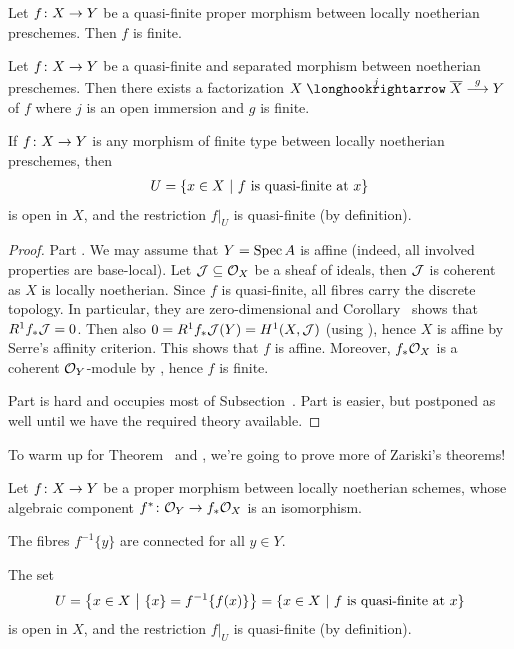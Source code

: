 \documentclass[a4paper,parskip=half,numbers=enddot, DIV=12]{scrreprt}
\begin{document}
\begin{thm}
	\begin{alphanumerate}
		\item {}Let $f\colon X\morphism Y$ be a quasi-finite proper morphism between locally noetherian preschemes. Then $f$ is finite.
		\item Let $f\colon X\morphism Y$ be a quasi-finite and separated morphism between noetherian preschemes. Then there exists a factorization $X\monomorphism[j]\ov{X}\morphism[g]Y$ of $f$ where $j$ is an open immersion and $g$ is finite.
		\item If $f\colon X\morphism Y$ is any morphism of finite type between locally noetherian preschemes, then 
		\begin{align*}
			U=\left\{x\in X\ \middle|\  f\text{ is quasi-finite at }x\right\}
		\end{align*}
		is open in $X$, and the restriction $f|_U$ is quasi-finite (by definition).
	\end{alphanumerate}
\end{thm}
\begin{proof}
	Part . We may assume that $Y=\operatorname{Spec} A$ is affine (indeed, all involved properties are base-local). Let $\mathcal{J}\subseteq \mathcal{O}_X$ be a sheaf of ideals, then $\mathcal{J}$ is coherent as $X$ is locally noetherian. Since $f$ is quasi-finite, all fibres carry the discrete topology. In particular, they are zero-dimensional and Corollary~ shows that $R^1f_*\mathcal{J}=0$. Then also $0=R^1f_*\mathcal{J}(Y)=H^1(X,\mathcal{J})$ (using \cite[Proposition~1.5.1]{alggeo2}), hence $X$ is affine by Serre's affinity criterion. This shows that $f$ is affine. Moreover, $f_*\mathcal{O}_X$ is a coherent $\mathcal{O}_Y$-module by \cite[Theorem~5]{alggeo2}, hence $f$ is finite.
	
	Part  is hard and occupies most of Subsection~. Part  is easier, but postponed as well until we have the required theory available.
\end{proof}
To warm up for Theorem~ and , we're going to prove more of Zariski's theorems!
\begin{thm}
	Let $f\colon X\morphism Y$ be a proper morphism between locally noetherian schemes, whose algebraic component $f^*\colon \Oo_Y\morphism f_*\Oo_X$ is an isomorphism.
	\begin{alphanumerate}
		\item The fibres $f^{-1}\{y\}$ are connected for all $y\in Y$.
		\item The set
		\begin{align*}
			U=\left\{x\in X\ \middle|\  \{x\}=f^{-1}\{f(x)\}\right\}=\left\{x\in X\ \middle|\  f\text{ is quasi-finite at }x\right\}
		\end{align*}
		is open in $X$, and the restriction $f|_U$ is quasi-finite (by definition).
	\end{alphanumerate}
\end{thm}
\end{document}
